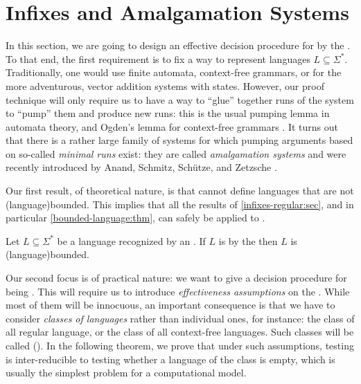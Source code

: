 \section{Infixes and Amalgamation Systems}
\label{infixes-amalgamation:sec}

\AP In this section, we are going to design an effective decision procedure for
 by the . To that end, the first
requirement is to fix a way to represent languages $L \subseteq \Sigma^*$.
Traditionally, one would use finite automata, context-free grammars, or for the
more adventurous, vector addition systems with states. However, our proof
technique will only require us to have a way to ``glue'' together runs of the
system to ``pump'' them and produce new runs: this is the usual pumping lemma
in automata theory, and Ogden's lemma for context-free grammars \cite{OGDEN68}.
It turns out that there is a rather large family of systems for which pumping
arguments based on so-called \emph{minimal runs} exist: they are called
\emph{amalgamation systems} and were recently introduced by Anand, Schmitz,
Schütze, and Zetzsche \cite{ASZZ24}.

\AP Our first result, of theoretical nature, is that 
cannot define  languages that are not
\kl(language){bounded}. This implies that all the results of
\cref{infixes-regular:sec}, and in
particular \cref{bounded-language:thm}, can safely be applied to
.

\begin{theorem}[label=infix-amalgamation:thm,restate=infix-amalgamation:thm]
    Let $L \subseteq \Sigma^*$ be a language recognized by an 
    .
    If $L$ is  by the  then $L$ is
    \kl(language){bounded}.
\end{theorem}

\AP Our second focus is of practical nature: we want to give a decision
procedure for being . This will require us to introduce
\emph{effectiveness assumptions} on the . While most
of them will be innocuous, an important consequence is that we have to consider
\emph{classes of languages} rather than individual ones, for instance: the
class of all regular language, or the class of all context-free languages. Such
classes will be called  (). In the following theorem, we prove that under such
assumptions, testing  is inter-reducible to testing
whether a language of the class is empty, which is usually the simplest
problem for a computational model.

